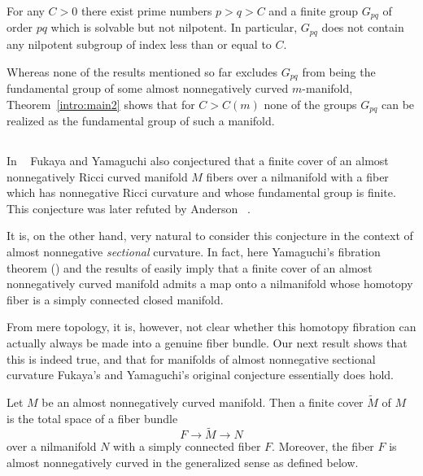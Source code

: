 \documentclass{amsart}
\begin{document}
\begin{ex} For any $C>0$ there exist
prime numbers $p>q>C$ and a finite group $G_{pq}$
of order $p q$
which is solvable but not nilpotent.
In particular, $G_{pq}$ does not contain any nilpotent subgroup
of index less than or equal to $C$.

Whereas none of the results mentioned so far
excludes %
$G_{pq}$
from being the fundamental group of some
almost nonnegatively curved $m$-manifold,
Theorem~\ref{intro:main2} shows that for $C>C(m)$ none of the groups $G_{pq}$
can be realized as the fundamental group of
such a manifold.
\end{ex}







\subsection{}
In  ~\cite{FY} Fukaya and Yamaguchi also conjectured
that a finite cover
of an almost nonnegatively Ricci curved manifold $M$
fibers over a nilmanifold with a fiber
which has nonnegative Ricci curvature and whose fundamental group is finite.
This conjecture
was later  refuted  by Anderson ~\cite{An}.


It is, on the other hand,  very natural to consider this conjecture
in the context of almost nonnegative {\sl sectional} curvature.
In fact, here %
Yamaguchi's fibration theorem (\cite{Yam})
and the results of \cite{FY} easily imply %
that a finite cover of an almost nonnegatively curved manifold
admits a map onto
 a nilmanifold whose homotopy fiber is a  simply connected closed manifold.

From mere topology, it is, however,
not clear whether this homotopy fibration
can actually  always be made into a genuine fiber bundle.
Our next result shows that
this is indeed true,
and that
for manifolds of almost nonnegative {sectional}  curvature
Fukaya's and Yamaguchi's original conjecture essentially does hold.


\begin{main}\label{intro:main3}

Let $M$ be an almost nonnegatively curved manifold.
Then a finite cover $\tilde{M}$ of $M$
is the total space of a fiber bundle
 $$
 F\to \tilde{M}\to N
 $$
over a nilmanifold $N$ with a simply connected fiber $F$.
Moreover, the fiber $F$
is  almost nonnegatively curved
in the generalized sense as defined below.

 \end{main}
\end{document}

